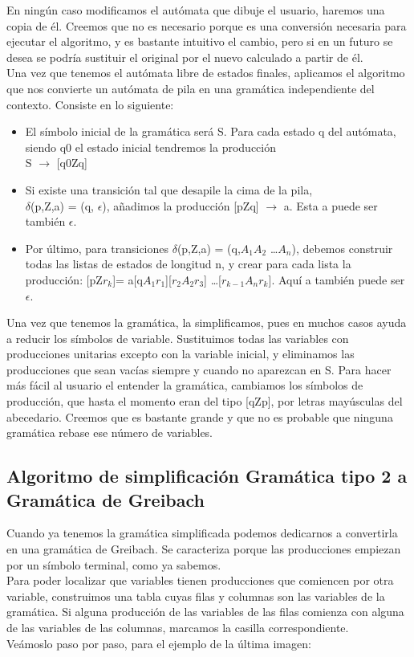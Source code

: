 \documentclass[12pt,a4paper,spanish]{book}
\begin{document}
En ning\'un caso modificamos el aut\'omata que dibuje el usuario, haremos una copia de \'el. Creemos que no es necesario porque es una conversi\'on necesaria para ejecutar el algoritmo, y es bastante intuitivo el cambio, pero si en un futuro se desea se podr\'ia sustituir el original por el nuevo calculado a partir de \'el.\\
\newpage
Una vez que tenemos el aut\'omata libre de estados finales, aplicamos el algoritmo que nos convierte un aut\'omata de pila en una gram\'atica independiente del contexto. Consiste en lo siguiente:
\begin{itemize}
\item El s\'imbolo inicial de la gram\'atica ser\'a S. Para cada estado q del aut\'omata, siendo q0 el estado inicial tendremos la producci\'on\\ S $\rightarrow$ [q0Zq]
\item Si existe una transici\'on tal que desapile la cima de la pila,\\ $\delta$(p,Z,a) = (q, $\epsilon$),
a\~nadimos la producci\'on [pZq] $\rightarrow$ a. Esta a puede ser tambi\'en $\epsilon$.
\item Por \'ultimo, para transiciones $\delta$(p,Z,a) = (q,$A_{1}A_{2}$ \ldots $A_{n}$), debemos construir todas las listas de estados de longitud n, y crear para cada lista la producci\'on:
[pZ$r_{k}$]= a[q$A_{1}r_{1}$][$r_{2}A_{2}r_{3}$] \ldots [$r_{k-1}A_{n}r_{k}$]. Aqu\'i a tambi\'en puede ser $\epsilon$.
\end{itemize}
Una vez que tenemos la gram\'atica, la simplificamos, pues en muchos casos ayuda a reducir los s\'imbolos de variable. Sustituimos todas las variables con producciones unitarias excepto con la variable inicial, y eliminamos las producciones que sean vac\'ias siempre y cuando no aparezcan en S. Para hacer m\'as f\'acil al usuario el entender la gram\'atica, cambiamos los s\'imbolos de producci\'on, que hasta el momento eran del tipo [qZp], por letras may\'usculas del abecedario. Creemos que es bastante grande y que no es probable que ninguna gram\'atica rebase ese n\'umero de variables.
\newpage
\subsection{Algoritmo de simplificaci\'on Gram\'atica tipo 2 a Gram\'atica de Greibach}
Cuando ya tenemos la gram\'atica simplificada podemos dedicarnos a convertirla en una gram\'atica de Greibach. Se caracteriza porque las producciones empiezan por un s\'imbolo terminal, como ya sabemos.\\ 
Para poder localizar que variables tienen producciones que comiencen por otra variable, construimos una tabla cuyas filas y columnas son las variables de la gram\'atica. Si alguna producci\'on de las variables de las filas comienza con alguna de las variables de las columnas, marcamos la casilla correspondiente.\\ 
Ve\'amoslo paso por paso, para el ejemplo de la \'ultima imagen:\\
\end{document}
